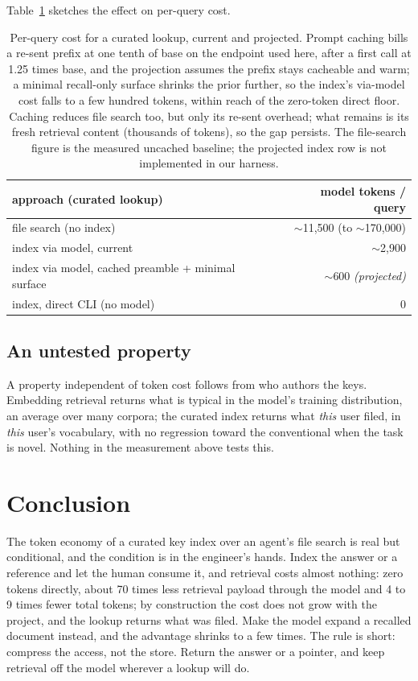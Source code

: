 \documentclass[11pt]{article}
\begin{document}
Table~\ref{tab:caching} sketches the effect on per-query cost.

\begin{table}[h]
\centering
\begin{tabular}{lr}
\toprule
\textbf{approach (curated lookup)} & \textbf{model tokens / query} \\
\midrule
file search (no index)                             & $\sim$11{,}500 (to $\sim$170{,}000) \\
index via model, current                           & $\sim$2{,}900 \\
index via model, cached preamble + minimal surface & $\sim$600 \emph{(projected)} \\
index, direct CLI (no model)                       & 0 \\
\bottomrule
\end{tabular}
\caption{Per-query cost for a curated lookup, current and projected. Prompt caching
bills a re-sent prefix at one tenth of base on the endpoint used here, after a
first call at 1.25 times base, and the projection assumes the prefix stays
cacheable and warm; a
minimal recall-only surface shrinks the prior further, so the index's via-model
cost falls to a few hundred tokens, within reach of the zero-token direct floor.
Caching reduces file search too, but only its re-sent overhead; what remains is its
fresh retrieval content (thousands of tokens), so the gap persists. The file-search
figure is the measured uncached baseline; the projected index row is not
implemented in our harness.}
\label{tab:caching}
\end{table}

\subsection*{An untested property}

A property independent of token cost follows from who authors the keys. Embedding
retrieval returns what is typical in the model's training distribution, an average
over many corpora; the curated index returns what \emph{this} user filed, in
\emph{this} user's vocabulary, with no regression toward the conventional when
the task is novel. Nothing in the measurement above tests this.

\section{Conclusion}

The token economy of a curated key index over an agent's file search is real but
conditional, and the condition is in the engineer's hands. Index the answer or a
reference and let the human consume it, and retrieval costs almost nothing:
zero tokens directly, about 70 times less retrieval payload through the model and
4 to 9 times fewer total tokens; by construction the cost does not grow with the
project, and the lookup returns what was filed. Make the model
expand a recalled document instead, and the advantage shrinks to a few times. The
rule is short: compress the access, not the store. Return the answer or a pointer,
and keep retrieval off the model wherever a lookup will do.
\end{document}
